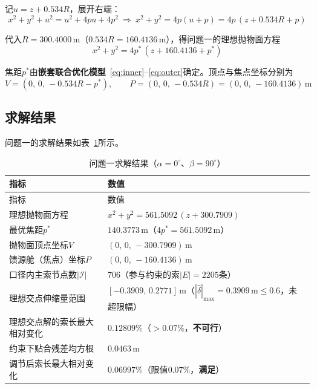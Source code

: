 \documentclass[withoutpreface]{cumcmthesis}
\begin{document}
记$u=z+0.534R$，展开右端：
\begin{equation}
x^{2}+y^{2}+u^{2}=u^{2}+4pu+4p^{2}\ \Longrightarrow\ x^{2}+y^{2}=4p(u+p)=4p\,(z+0.534R+p)
\end{equation}

代入$R=300.4000\,\mathrm{m}$（$0.534R=160.4136\,\mathrm{m}$），得问题一的理想抛物面方程
\begin{equation}\label{eq:q1_final}
\boxed{\;x^{2}+y^{2}=4p^{*}\,(z+160.4136+p^{*})\;}
\end{equation}

焦距$p^{*}$由\textbf{嵌套联合优化模型}~\eqref{eq:inner}--\eqref{eq:outer}确定。顶点与焦点坐标分别为
\begin{equation}
V=(0,\,0,\,-0.534R-p^{*}),\qquad P=(0,\,0,\,-0.534R)=(0,\,0,\,-160.4136)\,\mathrm{m}
\end{equation}

\subsection{求解结果}

问题一的求解结果如表~\ref{tab:q1_result}所示。

\begin{longtable}{p{5.4cm}p{7.6cm}}
\caption{问题一求解结果（$\alpha=0^{\circ}$、$\beta=90^{\circ}$）} \label{tab:q1_result} \\
\toprule
指标 & 数值 \\
\midrule
\endfirsthead
\toprule
指标 & 数值 \\
\midrule
\endhead
\bottomrule
\endfoot
\bottomrule
\endlastfoot
理想抛物面方程 & $x^{2}+y^{2}=561.5092\,(z+300.7909)$ \\
最优焦距$p^{*}$ & $140.3773\,\mathrm{m}$（$4p^{*}=561.5092\,\mathrm{m}$） \\
抛物面顶点坐标$V$ & $(0,\,0,\,-300.7909)\,\mathrm{m}$ \\
馈源舱（焦点）坐标$P$ & $(0,\,0,\,-160.4136)\,\mathrm{m}$ \\
口径内主索节点数$|\mathcal{I}|$ & $706$（参与约束的索$|E|=2205$条） \\
理想交点伸缩量范围 & $[-0.3909,\,0.2771]\,\mathrm{m}$（$|\hat{\delta}|_{\max}=0.3909\,\mathrm{m}\le0.6$，未超限幅） \\
理想交点解的索长最大相对变化 & $0.12809\%$（$>0.07\%$，\textbf{不可行}） \\
约束下贴合残差均方根 & $0.0463\,\mathrm{m}$ \\
调节后索长最大相对变化 & $0.06997\%$（限值$0.07\%$，\textbf{满足}） \\
\bottomrule
\end{longtable}
\end{document}
